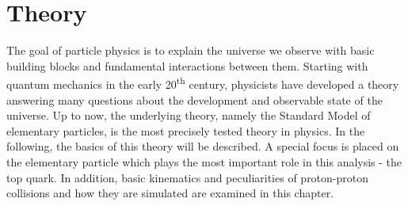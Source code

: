 \chapter{Theory}
\label{ch:Theo}
	The goal of particle physics is to explain the universe we observe with basic building blocks and fundamental interactions between them. Starting with quantum mechanics in the early 20\textsuperscript{th} century, physicists have developed a theory answering many questions about the development and observable state of the universe. Up to now, the underlying theory, namely the Standard Model of elementary particles, is the most precisely tested theory in physics. In the following, the basics of this theory will be described. A special focus is placed on the elementary particle which plays the most important role in this analysis - the top quark. In addition, basic kinematics and peculiarities of proton-proton collisions and how they are simulated are examined in this chapter. 
